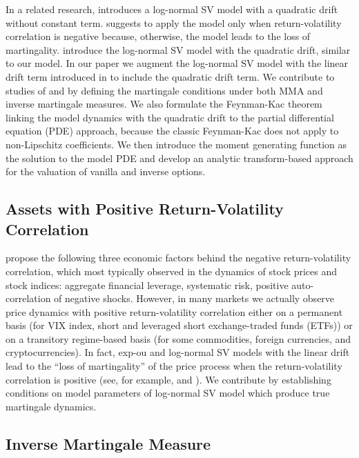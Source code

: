 \documentclass[pdftex,11pt,a4paper] {article}
\begin{document}
In a related research, \cite{Lewis2019} introduces a log-normal SV model with a quadratic drift without constant term. \cite{Lewis2019} suggests to apply the model only when return-volatility correlation is negative because, otherwise, the model leads to the loss of martingality. \cite{CarrWill} introduce the log-normal SV model with the quadratic drift, similar to our model. In our paper we augment the log-normal SV model with the linear drift term introduced in \cite{Sepp2012} to include the quadratic drift term. We contribute to studies of \cite{Lewis2019} and \cite{CarrWill} by defining the martingale conditions under both MMA and inverse martingale measures. We also formulate the Feynman-Kac theorem linking the model dynamics with the quadratic drift to the partial differential equation (PDE) approach, because the classic Feynman-Kac does not apply to non-Lipschitz coefficients. We then introduce the moment generating function as the solution to the model PDE and develop an analytic transform-based approach for the valuation of vanilla and inverse options. 




\subsection{Assets with Positive Return-Volatility Correlation}

\cite{CarrWu} propose the following three economic factors behind the negative return-volatility correlation, which most typically observed in the dynamics of stock prices and stock indices: aggregate financial leverage, systematic risk, positive auto-correlation of negative shocks. However, in many markets we actually observe price dynamics with positive return-volatility correlation either on a permanent basis (for VIX index, short and leveraged short exchange-traded funds (ETFs)) or on a transitory regime-based basis (for some commodities, foreign currencies, and cryptocurrencies). In fact, exp-ou and log-normal SV models with the linear drift lead to the ``loss of martingality'' of the price process when the return-volatility correlation is positive (see, for example, \cite{Lewis2000, Lewis2019} and \cite{Lions2007}). We contribute by establishing conditions on model parameters of log-normal SV model which produce true martingale dynamics. 



\subsection{Inverse Martingale Measure}
\end{document}
